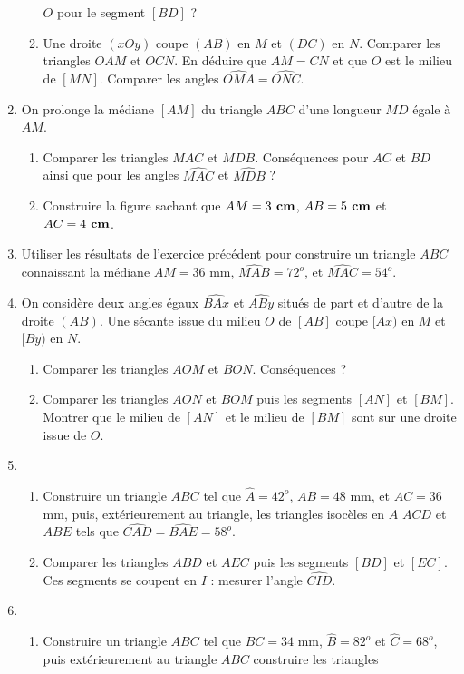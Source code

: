 \begin{enumerate}
\begin{enumerate}
$O$ pour le segment $[BD]$ ? 
\item Une droite $(xOy)$ coupe $(AB)$ en $M$ et $(DC)$ en $N$. Comparer les triangles
$OAM$ et $OCN$. En déduire que $AM=CN$ et que $O$ est le milieu de $[MN]$. Comparer
les angles $\widehat{OMA}=\widehat{ONC}$. 
\end{enumerate}
\item On prolonge la médiane $[AM]$ du triangle $ABC$ d'une longueur $MD$ égale à $AM$. \begin{enumerate}
\item Comparer les triangles $MAC$ et $MDB$. Conséquences pour $AC$ et $BD$ ainsi que pour les angles $\widehat{MAC}$ et $\widehat{MDB}$ ?
\item Construire la figure sachant que $AM = 3\textbf{ cm}$, $AB=5\textbf{ cm}$ et $AC=4\textbf{ cm}$. 
\end{enumerate}
\item Utiliser les résultats de l'exercice précédent pour construire un triangle 
$ABC$ connaissant la médiane $AM = 36$ mm, $\widehat{MAB}= 72^o$, et $\widehat{MAC}= 54^o$. 
\item On considère deux angles égaux $\widehat{BAx}$ et $\widehat{ABy}$ situés
de part et d'autre de la droite $(AB)$. Une sécante issue du milieu $O$ de $[AB]$ coupe $[Ax)$ en $M$ et $[By)$ en $N$. \begin{enumerate}
\item Comparer les triangles $AOM$ et $BON$. Conséquences ? 
\item Comparer les triangles $AON$ et $BOM$ puis les segments $[AN]$ et $[BM]$.
Montrer que le milieu de $[AN]$ et le milieu de $[BM]$ sont sur une droite issue de 
$O$. 
\end{enumerate}
\item \begin{enumerate}
\item Construire un triangle $ABC$ tel que $\widehat{A}=42^o$, $AB=48$ mm, et $AC=36$ mm, puis, extérieurement au triangle, les triangles isocèles en $A$ $ACD$ et $ABE$ tels que $\widehat{CAD}= \widehat{BAE}= 58^o$.
\item Comparer les triangles $ABD$ et $AEC$ puis les segments $[BD]$ et $[EC]$. Ces
segments se coupent en $I$ : mesurer l'angle $\widehat{CID}$. 
\end{enumerate}
\item \begin{enumerate}
\item Construire un triangle $ABC$ tel que $BC=34$ mm, $\widehat{B}=82^o$ et $\widehat{C}= 68^o$, puis extérieurement au triangle $ABC$ construire les triangles 

\end{enumerate}
\end{enumerate}
